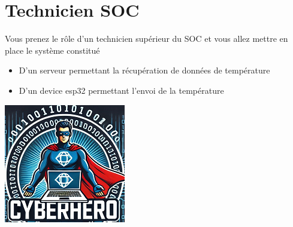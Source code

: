 \documentclass[french, 12pt]{article}%
\newcommand{\itemE}{\item[$\bullet$]}
\begin{document}
%
%
%

\newpage
\section{Technicien SOC}

Vous prenez le rôle d'un technicien supérieur du SOC et vous allez mettre en place le système constitué 


\begin{minipage}{0.55\linewidth}
\begin{itemize}
\itemE D'un serveur permettant la récupération de données de température
\itemE D'un device esp32 permettant l'envoi de la température
\end{itemize}
\end{minipage}
\begin{minipage}{0.44\linewidth}
\begin{center}
\includegraphics[scale=0.7]{./ressource/cyberHro.png}
\end{center}
\end{minipage}
\end{document}
